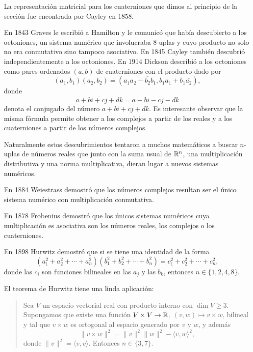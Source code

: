 La representación matricial para los cuaterniones que dimos al principio de la
sección fue encontrada por Cayley en 1858. 

En 1843 Graves le escribió a Hamilton y le comunicó que había descubierto a los
octoniones, un sistema numérico que involucraba $8$-uplas y cuyo producto no
solo no era conmutativo sino tampoco asociativo. En 1845 Cayley también
descubrió independientemente a los octoniones. En 1914 Dickson describió a los
octoniones como pares ordenados $(a,b)$ de cuaterniones con el producto dado por
\[
	(a_1,b_1)(a_2,b_2)=(a_1a_2-\overline{b_2}b_1,b_1a_1+b_1\overline{a_2}),
\]
donde 
\[
	\overline{a+bi+cj+dk}=a-bi-cj-dk
\]
denota el conjugado del número
$a+bi+cj+dk$. Es interesante observar que la misma fórmula permite obtener a
los complejos a partir de los reales y a los cuaterniones a partir de los
números complejos. 

Naturalmente estos descubrimientos tentaron a muchos matemáticos a buscar
$n$-uplas de números reales que junto con la suma usual de $\mathbb{R}^n$, una
multiplicación distributiva y una norma multiplicativa, dieran lugar a nuevos
sistemas numéricos. 

En 1884 Weiestrass demostró que los números complejos
resultan ser el único sistema numérico con multiplicación conmutativa.  

En 1878
Frobenius demostró que los únicos sistemas numéricos cuya multiplicación es
asociativa son los números reales, los complejos o los cuaterniones.  

En 1898
Hurwitz demostró que si se tiene una identidad de la forma
\[
	(a_1^2+a_2^2+\cdots+a_n^2)(b_1^2+b_2^2+\cdots+b_n^2)
	=c_1^2+c_2^2+\cdots+c_n^2,
\]
donde las $c_i$ son funciones bilineales en las $a_j$ y las $b_k$, entonces
$n\in\{1,2,4,8\}$. 

El teorema de Hurwitz tiene una linda aplicación: 

\begin{quote}
Sea $V$ un espacio vectorial real con producto interno con $\dim V\geq3$.
Supongamos que existe una función $V\times V\to\mathbb{R}$, $(v,w)\mapsto v\times w$,
bilineal y tal que $v\times w$ es ortogonal al espacio generado por $v$ y $w$,
y además 
\[
	\|v\times w\|^2=\|v\|^2\|w\|^2-\langle v,w\rangle^2,
\]
donde $\|v\|^2=\langle v,v\rangle$. Entonces $n\in\{3,7\}$. 
\end{quote}

